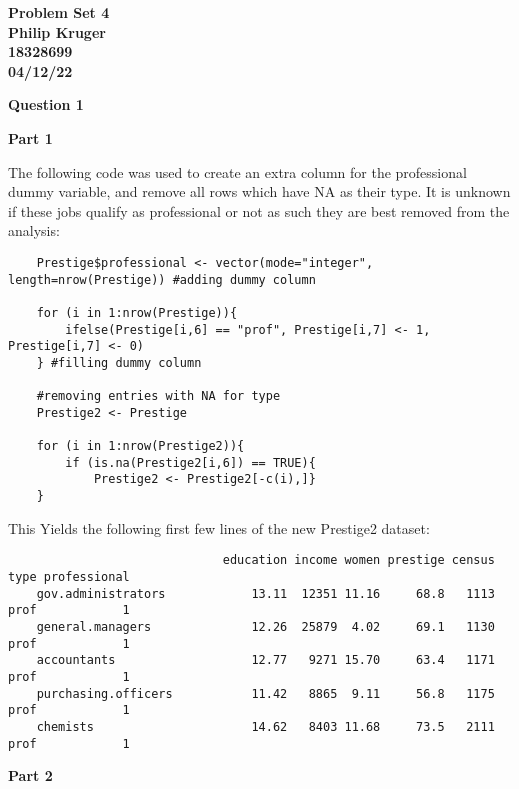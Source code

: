\documentclass{article}
\begin{document}
	
	\begin{center}
		\textbf{
			{\LARGE Problem Set 4}\\
			Philip Kruger\\
			18328699\\
			04/12/22\\
		}
	\end{center}
	\vspace{10mm}
	\textbf{\Large Question 1\\}
	
	\noindent\textbf{\large Part 1\\}
	
	
The following code was used to create an extra column for the professional dummy variable, and remove all rows which have NA as their type. It is unknown if these jobs qualify as professional or not as such they are best removed from the analysis:
\begin{verbatim}
	Prestige$professional <- vector(mode="integer", length=nrow(Prestige)) #adding dummy column
	
	for (i in 1:nrow(Prestige)){
		ifelse(Prestige[i,6] == "prof", Prestige[i,7] <- 1, Prestige[i,7] <- 0)
	} #filling dummy column
	
	#removing entries with NA for type
	Prestige2 <- Prestige
	
	for (i in 1:nrow(Prestige2)){
		if (is.na(Prestige2[i,6]) == TRUE){
			Prestige2 <- Prestige2[-c(i),]}
	}
\end{verbatim}
This Yields the following first few lines of the new Prestige2 dataset:
\begin{verbatim}
	                          education income women prestige census type professional
	gov.administrators            13.11  12351 11.16     68.8   1113 prof            1
	general.managers              12.26  25879  4.02     69.1   1130 prof            1
	accountants                   12.77   9271 15.70     63.4   1171 prof            1
	purchasing.officers           11.42   8865  9.11     56.8   1175 prof            1
	chemists                      14.62   8403 11.68     73.5   2111 prof            1
\end{verbatim}
\vspace{10mm}
	\noindent\textbf{\large Part 2\\}
\end{document}
